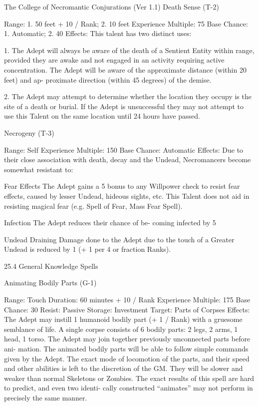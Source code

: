 \begin{Chapter}{The College of Necromantic Conjurations (Ver 1.1)}
Death Sense (T-2) 

Range: 1. 50 feet + 10 / Rank; 2. 10 feet 
Experience Multiple: 75 
Base Chance: 1. Automatic; 2. 40%
Effects: This talent has two distinct uses: 

1. The Adept will always be aware of the death of a 
Sentient  Entity  within  range,  provided  they  are 
awake  and  not  engaged  in  an  activity  requiring 
active  concentration.  The  Adept  will  be  aware  of 
the  approximate  distance  (within  20  feet)  and  ap-
proximate  direction  (within  45  degrees)  of  the 
demise. 

2.  The  Adept  may  attempt  to  determine  whether 
the  location  they  occupy  is  the  site  of  a  death  or 
burial.  If  the  Adept  is  unsuccessful  they  may  not 
attempt  to  use  this  Talent  on  the  same  location 
until 24 hours have passed. 

Necrogeny (T-3) 

Range: Self 
Experience Multiple: 150 
Base Chance: Automatic 
Effects:  Due  to  their  close  association  with  death, 
decay  and  the  Undead,  Necromancers  become 
somewhat resistant to: 

Fear  Effects  The  Adept  gains  a  5%
bonus to any Willpower check to resist fear effects, 
caused  by  lesser  Undead,  hideous  sights,  etc.  This 
Talent  does  not  aid  in  resisting  magical  fear  (e.g. 
Spell of Fear, Mass Fear Spell). 

Infection  The  Adept  reduces  their  chance  of  be-
coming infected by 5%

Undead Draining Damage done to the Adept due 
to the touch of a Greater Undead is reduced by 1 (+ 
1 per 4 or fraction Ranks). 

25.4 General Knowledge Spells 

Animating Bodily Parts (G-1) 

Range: Touch 
Duration: 60 minutes + 10 / Rank 
Experience Multiple: 175 
Base Chance: 30%
Resist: Passive 
Storage: Investment 
Target: Parts of Corpses 
Effects:  The  Adept  may  instill  1  humanoid  bodily 
part  (+  1  /  Rank)  with  a  gruesome  semblance  of 
life.  A  single  corpse  consists  of  6  bodily  parts:  2 
legs,  2  arms,  1 head, 1 torso.  The  Adept  may  join 
together  previously  unconnected  parts  before  ani-
mation.  The  animated  bodily  parts  will  be  able  to 
follow  simple  commands  given by  the  Adept.  The 
exact  mode  of  locomotion  of  the  parts,  and  their 
speed and other abilities is left to the discretion of 
the  GM.  They  will  be  slower  and  weaker  than 
normal Skeletons or Zombies. The exact results of 
this  spell  are  hard to  predict,  and  even  two  identi-
cally  constructed  “animates”  may  not  perform  in 
precisely the same manner. 


\end{Chapter}
